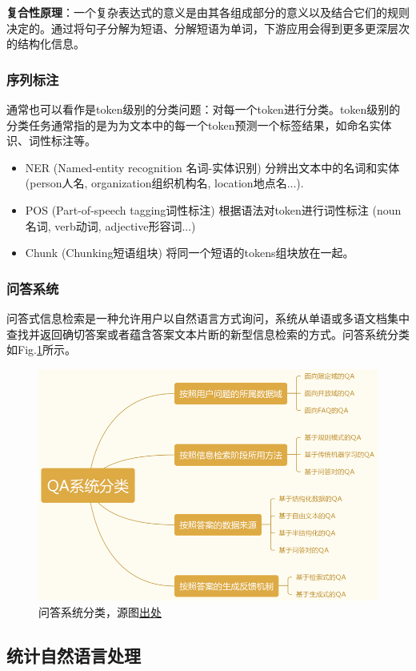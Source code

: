 \textbf{复合性原理}：一个复杂表达式的意义是由其各组成部分的意义以及结合它们的规则决定的。通过将句子分解为短语、分解短语为单词，下游应用会得到更多更深层次的结构化信息。

\subsubsection{序列标注}
通常也可以看作是token级别的分类问题：对每一个token进行分类。token级别的分类任务通常指的是为为文本中的每一个token预测一个标签结果，如命名实体识、词性标注等。
\begin{itemize}
	\item NER (Named-entity recognition 名词-实体识别) 分辨出文本中的名词和实体 (person人名, organization组织机构名, location地点名...).
	\item POS (Part-of-speech tagging词性标注) 根据语法对token进行词性标注 (noun名词, verb动词, adjective形容词...)
	\item Chunk (Chunking短语组块) 将同一个短语的tokens组块放在一起。
\end{itemize}

\subsubsection{问答系统}
问答式信息检索是一种允许用户以自然语言方式询问，系统从单语或多语文档集中查找并返回确切答案或者蕴含答案文本片断的新型信息检索的方式。问答系统分类如Fig.\ref{fig:qa}所示。
\begin{figure}[h]
	\centering
	\includegraphics[width=.7\textwidth]{pics/qa.png}
	\caption{问答系统分类，源图\href{https://blog.csdn.net/sinat_33231573/article/details/83473741}{出处}}
	\label{fig:qa}
\end{figure}






\subsection{统计自然语言处理}
